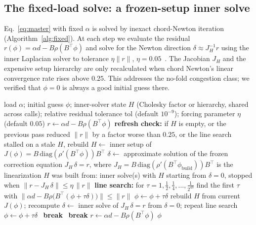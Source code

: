 \documentclass{siamart220329}
\begin{document}
\subsection{The fixed-load solve: a frozen-setup inner solve}\label{sec:fas}
Eq.~\eqref{eq:master} with fixed $\alpha$ is solved by inexact chord-Newton iteration (Algorithm~\ref{alg:fixed}). At each step we evaluate the residual $r(\phi)=\alpha d-B\rho(B^{\top}\phi)$ and solve for the Newton direction $\delta\approx J_H^{-1}r$ using the inner Laplacian solver to tolerance $\eta\|r\|$, $\eta=0.05$~\cite{inexact-newton}. The Jacobian $J_H$ and the expensive setup hierarchy are only recalculated when chord Newton's linear convergence rate rises above $0.25$. This addresses the no-fold congestion class; we verified that $\phi=0$ is always a good initial guess there.
\begin{algorithm}[t]
\caption{NLF fixed-load solve}
\label{alg:fixed}
\begin{algorithmic}[1]
\Require load $\alpha$; initial guess $\phi$; inner-solver state $H$ (Cholesky factor or hierarchy, shared across calls); relative
residual tolerance $\mathrm{tol}$ (default $10^{-9}$); forcing parameter $\eta$ (default $0.05$)
\State $r \gets \alpha d - B\rho(B^{\top}\phi)$
\State \textbf{refresh check:} if $H$ is empty, or the previous pass reduced $\|r\|$ by a factor
worse than $0.25$, or the line search stalled on a stale $H$, rebuild $H\gets$ inner setup of
$J(\phi)=B\,\mathrm{diag}(\rho'(B^{\top}\phi))B^{\top}$
\State $\delta \gets$ approximate solution of the frozen correction equation $J_H\,\delta = r$,
where $J_H=B\,\mathrm{diag}(\rho'(B^{\top}\phi_{\mathrm{build}}))B^{\top}$ is the linearization
$H$ was built from: inner solve(s) with $H$ starting from $\delta=0$, stopped when
$\|r - J_H\,\delta\| \le \eta\,\|r\|$
\State \textbf{line search:} for $\tau=1,\tfrac12,\tfrac14,\dots,\frac{1}{2^{49}}$ find the first $\tau$ with
$\big\|\alpha d - B\rho\big(B^{\top}(\phi+\tau\delta)\big)\big\| \le \|r\|$
 $\phi\gets\phi+\tau\delta$
 rebuild $H$ from current $J(\phi)$;
recompute $\delta\gets$ inner solve of $J_H\,\delta=r$ from $\delta=0$; repeat line search
   $\phi\gets\phi+\tau\delta$
  \Else\ \textbf{break} 
  \EndIf
\Else\ \textbf{break} 
\EndIf
\State $r \gets \alpha d - B\rho(B^{\top}\phi)$
\EndWhile
\State \Return $\phi$
\end{algorithmic}
\end{algorithm}
\end{document}
